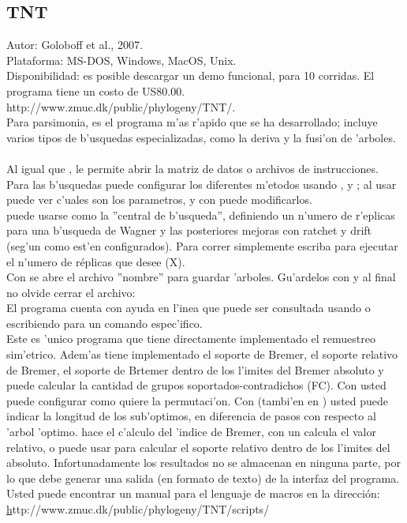 \subsection{TNT}
\noindent
Autor: Goloboff et al., 2007.\\
Plataforma: MS-DOS, Windows, MacOS, Unix.\\
Disponibilidad: es posible descargar un demo funcional, para 10 corridas. 
El programa tiene un costo de US80.00.\\
http://www.zmuc.dk/public/phylogeny/TNT/.
\\
Para parsimonia, es el programa m'as r'apido que se ha desarrollado; incluye varios tipos de b'usquedas especializadas, como la deriva y la fusi'on de 'arboles.\\
\\
Al igual que ,  le permite abrir la matriz de datos o archivos de instrucciones. Para las b'usquedas puede configurar los diferentes m'etodos usando ,  y ; al usar  puede ver c'uales son los parametros, y con \Cmd{=} puede modificarlos.\\  puede usarse como la ''central de b'usqueda'', definiendo un n'umero de r'eplicas para una b'usqueda de Wagner y las posteriores mejoras con ratchet y drift (seg'un como est'en configurados). Para correr simplemente escriba  para ejecutar el n'umero de r\'eplicas que desee (X).\\
Con  se abre el archivo ''nombre'' para guardar 'arboles. Gu'ardelos con  y al final no olvide cerrar el archivo: \\
El programa cuenta con ayuda en l'inea que puede ser consultada usando  o escribiendo  para un comando espec'ifico.\\
Este es 'unico programa que tiene directamente implementado el remuestreo sim'etrico. Adem'as tiene implementado el soporte de Bremer, el soporte relativo de Bremer, el soporte de Brtemer dentro de los l'imites del Bremer absoluto y puede calcular la cantidad de grupos soportados-contradichos (FC). Con  usted puede configurar como quiere la permutaci'on. Con  (tambi'en en ) usted puede indicar la longitud de los sub'optimos, en diferencia de pasos con respecto al 'arbol 'optimo.  hace el c'alculo del 'indice de Bremer, con un \Cmd{*} calcula el valor relativo, o puede usar \Cmd{Bsupport ]} para calcular el soporte relativo dentro de los l'imites del absoluto. Infortunadamente los resultados no se almacenan en ninguna parte, por lo que debe generar una salida (en formato de texto) de la interfaz del programa.\\
Usted puede encontrar un manual para el lenguaje de macros en la direcci\'on:\\ 
\href{}http://www.zmuc.dk/public/phylogeny/TNT/scripts/